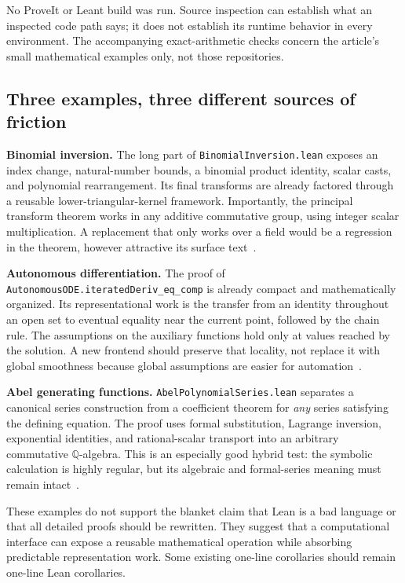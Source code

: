 \documentclass[11pt,a4paper]{article}
\newcommand{\code}[1]{\nolinkurl{#1}}
\newcommand{\Q}{\mathbb Q}
\theoremstyle{definition}
\begin{document}
No ProveIt or Leant build was run. Source inspection can establish what an inspected code path says; it does not establish its runtime behavior in every environment. The accompanying exact-arithmetic checks concern the article's small mathematical examples only, not those repositories.

\subsection{Three examples, three different sources of friction}
\textbf{Binomial inversion.} The long part of \code{BinomialInversion.lean} exposes an index change, natural-number bounds, a binomial product identity, scalar casts, and polynomial rearrangement. Its final transforms are already factored through a reusable lower-triangular-kernel framework. Importantly, the principal transform theorem works in any additive commutative group, using integer scalar multiplication. A replacement that only works over a field would be a regression in the theorem, however attractive its surface text~\cite{pbin}.

\textbf{Autonomous differentiation.} The proof of \code{AutonomousODE.iteratedDeriv_eq_comp} is already compact and mathematically organized. Its representational work is the transfer from an identity throughout an open set to eventual equality near the current point, followed by the chain rule. The assumptions on the auxiliary functions hold only at values reached by the solution. A new frontend should preserve that locality, not replace it with global smoothness because global assumptions are easier for automation~\cite{pode}.

\textbf{Abel generating functions.} \code{AbelPolynomialSeries.lean} separates a canonical series construction from a coefficient theorem for \emph{any} series satisfying the defining equation. The proof uses formal substitution, Lagrange inversion, exponential identities, and rational-scalar transport into an arbitrary commutative \(\Q\)-algebra. This is an especially good hybrid test: the symbolic calculation is highly regular, but its algebraic and formal-series meaning must remain intact~\cite{pabel}.

These examples do not support the blanket claim that Lean is a bad language or that all detailed proofs should be rewritten. They suggest that a computational interface can expose a reusable mathematical operation while absorbing predictable representation work. Some existing one-line corollaries should remain one-line Lean corollaries.
\end{document}
